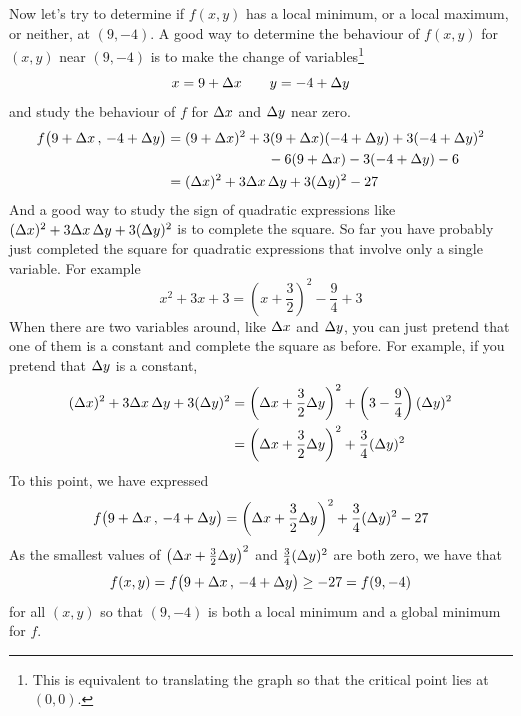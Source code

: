\begin{eg}[$f(x,y)= x^2+3xy+3y^2-6x-3y-6$]
Now let's try to determine if $f(x,y)$ has a local minimum, or a local maximum,
or neither, at $(9,-4)$. A good way to determine the behaviour of $f(x,y)$
for $(x,y)$ near $(9,-4)$ is to make the change of variables\footnote{This
is equivalent to translating the graph so that the critical point 
lies at $(0,0)$.}
\begin{equation*}
x=9+\Delta x\qquad
y=-4+\Delta y
\end{equation*}
and study the behaviour of $f$ for $\Delta x$ and $\Delta y$ near zero.
\begin{align*}
f\big(9+\Delta x\,,\,-4+\Delta y\big)
&=(9+\Delta x)^2+3(9+\Delta x)(-4+\Delta y)+3(-4+\Delta y)^2\\
&\hskip1in-6(9+\Delta x)-3(-4+\Delta y)-6 \\
&= (\Delta x)^2 +3\Delta x\,\Delta y+3(\Delta y)^2 - 27
\end{align*}
And a good way to study the sign of quadratic expressions like
$(\Delta x)^2 +3\Delta x\,\Delta y+3(\Delta y)^2$ is to complete the square.
So far you have probably just completed the square for quadratic expressions 
that involve only a single variable. For example
\begin{equation*}
x^2 +3x +3 = \left(x+\frac{3}{2}\right)^2 - \frac{9}{4} +3
\end{equation*}
When there are two variables around, like $\Delta x$ and $\Delta y$,
you can just pretend that one of them is a constant and complete
the square as before. For example, if you pretend that $\Delta y$
is a constant,
\begin{align*}
(\Delta x)^2 +3\Delta x\,\Delta y+3(\Delta y)^2
&=\left(\Delta x +\frac{3}{2}\Delta y\right)^2  
           + \left(3-\frac{9}{4}\right)(\Delta y)^2\\
&=\left(\Delta x +\frac{3}{2}\Delta y\right)^2  + \frac{3}{4}(\Delta y)^2
\end{align*}
To this point, we have expressed
\begin{equation*}
f\big(9+\Delta x\,,\,-4+\Delta y\big)
  = \left(\Delta x +\frac{3}{2}\Delta y\right)^2  + \frac{3}{4}(\Delta y)^2 -27
\end{equation*}
As the smallest values of $\left(\Delta x +\frac{3}{2}\Delta y\right)^2$ 
and $\frac{3}{4}(\Delta y)^2$ are both zero, we have that
\begin{equation*}
f(x,y)=f\big(9+\Delta x\,,\,-4+\Delta y\big)\ge -27 =f(9,-4)
\end{equation*}
for all $(x,y)$ so that $(9,-4)$ is both a local minimum and a global minimum
for $f$. 

\end{eg}

